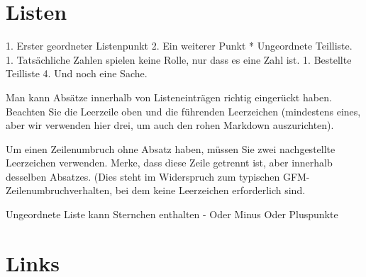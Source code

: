 \documentclass[12pt,de-CH,twoside,openright]{report}
\newenvironment{Shaded}{\begin{snugshade}}{\end{snugshade}}
\newcommand{\FloatTok}[1]{\textcolor[rgb]{0.00,0.00,0.81}{#1}}
\newcommand{\NormalTok}[1]{#1}
\begin{document}
\hypertarget{listen}{%
\section{Listen}\label{listen}}

\begin{Shaded}
\begin{Highlighting}[]
\NormalTok{1. }\FloatTok{Erster geordneter Listenpunkt}
\FloatTok{2. Ein weiterer Punkt}
\FloatTok{  * Ungeordnete Teilliste.}
\FloatTok{1. Tatsächliche Zahlen spielen keine Rolle, nur dass es eine Zahl ist.}
\FloatTok{  1. Bestellte Teilliste}
\FloatTok{4. Und noch eine Sache.}

\NormalTok{   Man kann Absätze innerhalb von Listeneinträgen richtig eingerückt haben. Beachten Sie die Leerzeile oben und die führenden Leerzeichen (mindestens eines, aber wir verwenden hier drei, um auch den rohen Markdown auszurichten).}

\NormalTok{   Um einen Zeilenumbruch ohne Absatz haben, müssen Sie zwei nachgestellte Leerzeichen verwenden.}
\NormalTok{   Merke, dass diese Zeile getrennt ist, aber innerhalb desselben Absatzes.}
\NormalTok{   (Dies steht im Widerspruch zum typischen GFM-Zeilenumbruchverhalten, bei dem keine Leerzeichen erforderlich sind.}

\NormalTok{Ungeordnete Liste kann Sternchen enthalten}
\NormalTok{- }\FloatTok{Oder Minus}
\FloatTok{Oder Pluspunkte}
\end{Highlighting}
\end{Shaded}

\hypertarget{links}{%
\section{Links}\label{links}}
\end{document}
